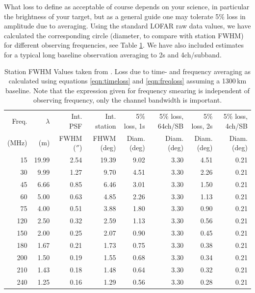 \documentclass[graybox]{svmult}
\begin{document}
What loss to define as acceptable of course depends on your science, in
particular the brightness of your target, but as a general guide one may
tolerate 5\% loss in amplitude due to averaging. Using the standard LOFAR raw
data values, we have calculated the corresponding circle (diameter, to compare
with station FWHM) for different observing frequencies, see Table
\ref{tab:res}. We have also included estimates for a typical long baseline 
observation averaging to 2s and 4ch/subband.


\begin{table}[h]
\centering
\begin{tabular}{rrrr|rr|rr}
\hline\hline
Freq. & $\lambda$ & Int. PSF & Int. station& 5\% loss, 1s& 5\% loss, 64ch/SB & 5\% loss, 2s& 5\% loss, 4ch/SB\\
(MHz) & (m) & FWHM ($''$) & FHWM (deg) & Diam. (deg) & Diam. (deg) & Diam. (deg) & Diam. (deg)\\
\hline
 15 & 19.99 & 2.54&19.39 & 9.02 & 3.30& 4.51 & 0.21\\
 30 & 9.99 & 1.27 & 9.70 & 4.51 & 3.30& 2.26 & 0.21\\
 45 & 6.66 & 0.85 & 6.46 & 3.01 & 3.30& 1.50 & 0.21\\
 60 & 5.00 & 0.63 & 4.85 & 2.26 & 3.30& 1.13 & 0.21\\
 75 & 4.00 & 0.51 & 3.88 & 1.80 & 3.30& 0.90 & 0.21\\
120 & 2.50 & 0.32 & 2.59 & 1.13 & 3.30& 0.56 & 0.21\\
150 & 2.00 & 0.25 & 2.07 & 0.90 & 3.30& 0.45 & 0.21\\
180 & 1.67 & 0.21 & 1.73 & 0.75 & 3.30& 0.38 & 0.21\\
200 & 1.50 & 0.19 & 1.55 & 0.68 & 3.30& 0.34 & 0.21\\
210 & 1.43 & 0.18 & 1.48 & 0.64 & 3.30& 0.32 & 0.21\\
240 & 1.25 & 0.16 & 1.29 & 0.56 & 3.30& 0.28 & 0.21\\

\hline
\end{tabular}
\caption{Station FWHM Values taken from \cite[App. B]{vanhaarlem13}. Loss due
to time- and frequency averaging as calculated using equations 
\ref{eqn:timeloss} and \ref{eqn:freqloss} assuming a 1300\,km baseline. Note that the expression
given for frequency smearing is independent of observing frequency, only the
channel bandwidth is important. 
\label{tab:res}}
\end{table}
\end{document}
